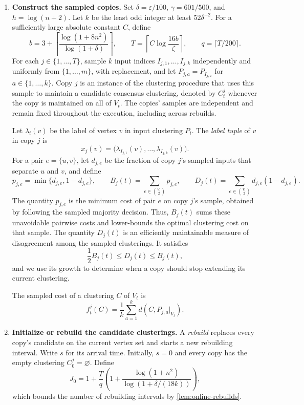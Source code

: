 \documentclass[11pt]{article}
\begin{document}
\begin{enumerate}
\item \textbf{Construct the sampled copies.}
Set $\delta=\varepsilon/100$, $\gamma=601/500$, and
$h=\log(n+2)$. Let $k$ be the least odd integer at least
$52\delta^{-2}$. For a sufficiently large absolute constant $C$,
define
\[
 b=3+\left\lceil\frac{\log(1+8n^2)}{\log(1+\delta)}\right\rceil,
 \qquad
 T=\left\lceil C\log\frac{16b}{\zeta}\right\rceil,
 \qquad q=\lceil T/200\rceil.
\]
For each $j\in\{1,\ldots,T\}$, sample $k$ input indices
$I_{j,1},\ldots,I_{j,k}$ independently and uniformly from
$\{1,\ldots,m\}$, with replacement, and let
$P_{j,a}=P_{I_{j,a}}$ for $a\in\{1,\ldots,k\}$.
Copy $j$ is an instance of the clustering procedure that uses this
sample to maintain a candidate consensus clustering, denoted by
$C_t^j$ whenever the copy is maintained on all of $V_t$. The copies'
samples are independent and remain fixed throughout the execution,
including across rebuilds.

Let $\lambda_i(v)$ be the label of vertex $v$ in input clustering
$P_i$. The \emph{label tuple} of $v$ in copy $j$ is
\[
 x_j(v)=\bigl(\lambda_{I_{j,1}}(v),\ldots,
                  \lambda_{I_{j,k}}(v)\bigr).
\]
For a pair $e=\{u,v\}$, let $d_{j,e}$ be the fraction of copy $j$'s
sampled inputs that separate $u$ and $v$, and define
\[
 p_{j,e}=\min\{d_{j,e},1-d_{j,e}\},\qquad
 B_j(t)=\sum_{e\in\binom{V_t}{2}}p_{j,e},\qquad
 D_j(t)=\sum_{e\in\binom{V_t}{2}}d_{j,e}(1-d_{j,e}).
\]
The quantity $p_{j,e}$ is the minimum cost of pair $e$ on copy $j$'s
sample, obtained by following the sampled majority decision. Thus,
$B_j(t)$ sums these unavoidable pairwise costs and lower-bounds the
optimal clustering cost on that sample. The quantity $D_j(t)$ is an
efficiently maintainable measure of disagreement among the sampled
clusterings. It satisfies
\[
    \frac{1}{2} B_j(t) \le D_j(t) \le B_j(t),
\]
and we use its growth to determine when a copy should stop extending
its current clustering.

The sampled cost of a clustering $C$ of $V_t$ is
\[
 f_t^j(C)=\frac1k\sum_{a=1}^k d(C,P_{j,a}|_{V_t}).
\]
\item \textbf{Initialize or rebuild the candidate clusterings.}
A \emph{rebuild} replaces every copy's candidate on the current
vertex set and starts a new rebuilding interval. Write $s$ for its
arrival time. Initially, $s=0$ and every copy has the empty clustering
$C_0^j=\varnothing$. Define
\[
 J_0=1+\frac{T}{q}\left(
 1+\frac{\log(1+n^2)}{\log(1+\delta/(18k))}\right),
\]
which bounds the number of rebuilding intervals by
\cref{lem:online-rebuilds}.


\end{enumerate}
\end{document}

